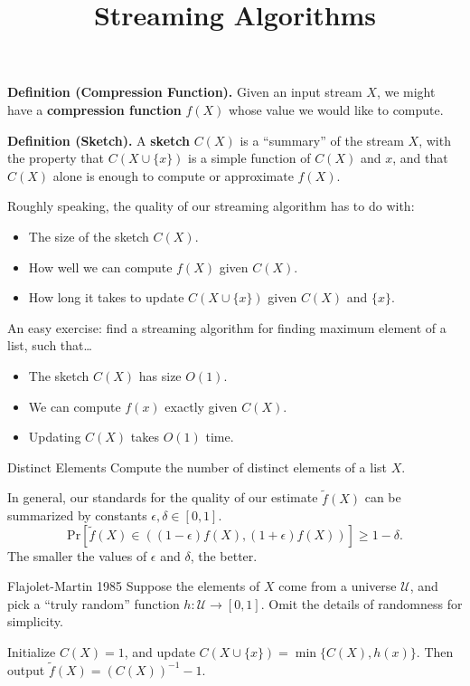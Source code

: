 \title{Streaming Algorithms}



\textbf{Definition (Compression Function).} Given an input stream $X$, we might have a \textbf{compression function} $f(X)$ whose value we would like to compute.

\textbf{Definition (Sketch).} A \textbf{sketch} $C(X)$ is a ``summary'' of the stream $X$, with the property that $C(X \cup \{x\})$ is a simple function of $C(X)$ and $x$, and that $C(X)$ alone is enough to compute or approximate $f(X)$.

Roughly speaking, the quality of our streaming algorithm has to do with:
\begin{itemize}
    \item The size of the sketch $C(X)$.
    \item How well we can compute $f(X)$ given $C(X)$.
    \item How long it takes to update $C(X \cup \{x\})$ given $C(X)$ and $\{x\}$.
\end{itemize}
\begin{remark}
    An easy exercise: find a streaming algorithm for finding maximum element of a list, such that\dots
    \begin{itemize}
        \item The sketch $C(X)$ has size $O(1)$.
        \item We can compute $f(x)$ exactly given $C(X)$.
        \item Updating $C(X)$ takes $O(1)$ time.
    \end{itemize}
\end{remark}

\begin{problem}{Distinct Elements}
    Compute the number of distinct elements of a list $X$.
\end{problem}

In general, our standards for the quality of our estimate $\tilde{f}(X)$ can be summarized by constants $\epsilon, \delta \in [0, 1]$.
\[ \mathrm{Pr}\left [ \tilde{f}(X) \in ((1 - \epsilon) f(X), (1 + \epsilon)f(X)) \right] \geq 1 - \delta. \]
The smaller the values of $\epsilon$ and $\delta$, the better.

\begin{solution}{Flajolet-Martin 1985}
    Suppose the elements of $X$ come from a universe $\mathcal{U}$, and pick a ``truly random'' function $h: \mathcal{U} \to [0, 1]$.  Omit the details of randomness for simplicity.

    Initialize $C(X) = 1$, and update $C(X \cup \{x\}) = \min\{C(X), h(x)\}$.  Then output $\tilde{f}(X) = (C(X))^{-1} - 1$.
\end{solution}

